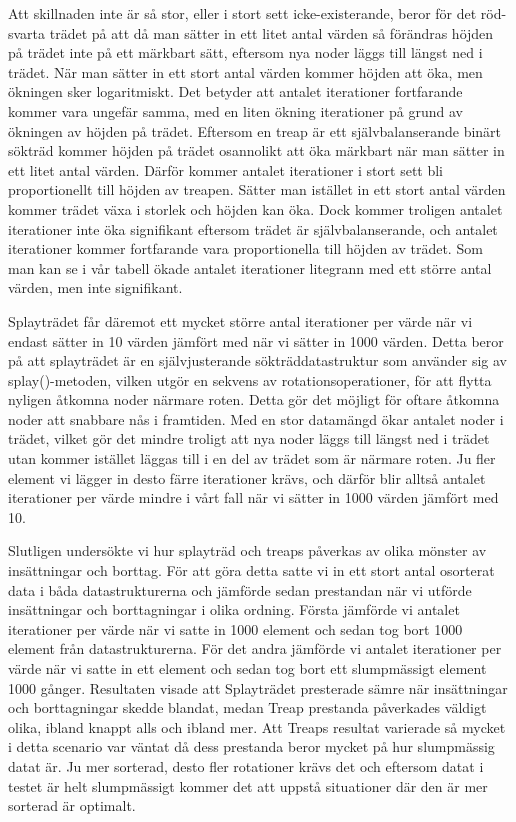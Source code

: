 \documentclass[a4paper,10pt,oneside]{article}
\begin{document}
Att skillnaden inte är så stor, eller i stort sett icke-existerande, beror för det röd-svarta trädet på att då man sätter in ett litet antal värden så förändras höjden på trädet inte på ett märkbart sätt, eftersom nya noder läggs till längst ned i trädet. När man sätter in ett stort antal värden kommer höjden att öka, men ökningen sker logaritmiskt. Det betyder att antalet iterationer fortfarande kommer vara ungefär samma, med en liten ökning iterationer på grund av ökningen av höjden på trädet. Eftersom en treap är ett självbalanserande binärt sökträd kommer höjden på trädet osannolikt att öka märkbart när man sätter in ett litet antal värden. Därför kommer antalet iterationer i stort sett bli proportionellt till höjden av treapen. Sätter man istället in ett stort antal värden kommer trädet växa i storlek och höjden kan öka. Dock kommer troligen antalet iterationer inte öka signifikant eftersom trädet är självbalanserande, och antalet iterationer kommer fortfarande vara proportionella till höjden av trädet. Som man kan se i vår tabell ökade antalet iterationer litegrann med ett större antal värden, men inte signifikant.

Splayträdet får däremot ett mycket större antal iterationer per värde när vi endast sätter in 10 värden jämfört med när vi sätter in 1000 värden. Detta beror på att splayträdet är en självjusterande sökträddatastruktur som använder sig av splay()-metoden, vilken utgör en sekvens av rotationsoperationer, för att flytta nyligen åtkomna noder närmare roten. Detta gör det möjligt för oftare åtkomna noder att snabbare nås i framtiden. Med en stor datamängd ökar antalet noder i trädet, vilket gör det mindre troligt att nya noder läggs till längst ned i trädet utan kommer istället läggas till i en del av trädet som är närmare roten. Ju fler element vi lägger in desto färre iterationer krävs, och därför blir alltså antalet iterationer per värde mindre i vårt fall när vi sätter in 1000 värden jämfört med 10.

Slutligen undersökte vi hur splayträd och treaps påverkas av olika mönster av insättningar och borttag. För att göra detta satte vi in ett stort antal osorterat data i båda datastrukturerna och jämförde sedan prestandan när vi utförde insättningar och borttagningar i olika ordning. Första jämförde vi antalet iterationer per värde när vi satte in 1000 element och sedan tog bort 1000 element från datastrukturerna. För det andra jämförde vi antalet iterationer per värde när vi satte in ett element och sedan tog bort ett slumpmässigt element 1000 gånger. Resultaten visade att Splayträdet presterade sämre när insättningar och borttagningar skedde blandat, medan Treap prestanda påverkades väldigt olika, ibland knappt alls och ibland mer. Att Treaps resultat varierade så mycket i detta scenario var väntat då dess prestanda beror mycket på hur slumpmässig datat är. Ju mer sorterad, desto fler rotationer krävs det och eftersom datat i testet är helt slumpmässigt kommer det att uppstå situationer där den är mer sorterad är optimalt. 
\end{document}

